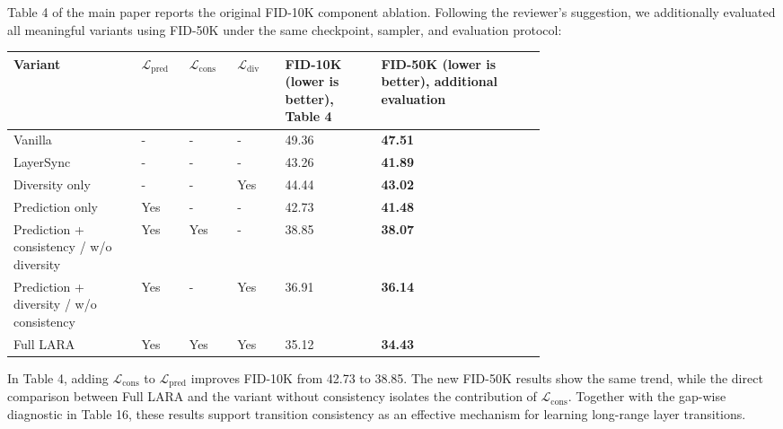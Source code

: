 \documentclass[10pt,letterpaper]{article}
\begin{document}
\begin{answerbox}
Table 4 of the main paper reports the original FID-10K component ablation. Following the reviewer's suggestion, we additionally evaluated all meaningful variants using FID-50K under the same checkpoint, sampler, and evaluation protocol:


\begin{cleanTable}
\scriptsize
\begin{tabularx}{\linewidth}{>{\RaggedRight\arraybackslash}p{0.24\linewidth} C{0.09\linewidth} C{0.09\linewidth} C{0.09\linewidth} C{0.18\linewidth} Y}
\bfseries\color{white} Variant & \bfseries\color{white} \(\mathcal{L}_{\mathrm{pred}}\) & \bfseries\color{white} \(\mathcal{L}_{\mathrm{cons}}\) & \bfseries\color{white} \(\mathcal{L}_{\mathrm{div}}\) & \bfseries\color{white} FID-10K (lower is better), Table 4 & \bfseries\color{white} FID-50K (lower is better), additional evaluation \\
\midrule
Vanilla & - & - & - & 49.36 & \textcolor{todored}{\bfseries 47.51} \\
LayerSync & - & - & - & 43.26 & \textcolor{todored}{\bfseries 41.89} \\
Diversity only & - & - & Yes & 44.44 & \textcolor{todored}{\bfseries 43.02} \\
Prediction only & Yes & - & - & 42.73 & \textcolor{todored}{\bfseries 41.48} \\
Prediction + consistency /\allowbreak{} w/\allowbreak{}o diversity & Yes & Yes & - & 38.85 & \textcolor{todored}{\bfseries 38.07} \\
Prediction + diversity /\allowbreak{} w/\allowbreak{}o consistency & Yes & - & Yes & 36.91 & \textcolor{todored}{\bfseries 36.14} \\
Full LARA & Yes & Yes & Yes & 35.12 & \textcolor{todored}{\bfseries 34.43} \\
\end{tabularx}
\end{cleanTable}


In Table 4, adding \(\mathcal{L}_{\mathrm{cons}}\) to \(\mathcal{L}_{\mathrm{pred}}\) improves FID-10K from 42.73 to 38.85. The new FID-50K results show the same trend, while the direct comparison between Full LARA and the variant without consistency isolates the contribution of \(\mathcal{L}_{\mathrm{cons}}\). Together with the gap-wise diagnostic in Table 16, these results support transition consistency as an effective mechanism for learning long-range layer transitions.


\end{answerbox}
\end{document}
